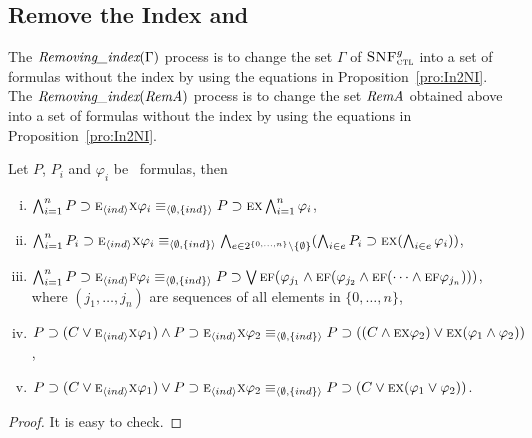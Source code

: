 \documentclass[letterpaper]{article} %
\begin{document}
\subsection{Remove the Index and \start}
The $\emph{Removing\_index}(\Gamma)$ process is to change the set $\Gamma$ of ${\textsc{SNF}_{\textsc{ctl}}^g}$ into a set of formulas without the index by using the equations in Proposition~\ref{pro:In2NI}.
The $\emph{Removing\_index}(\emph{RemA})$ process is to change the set $\emph{RemA}$ obtained above into a set of formulas without the index by using the equations in Proposition~\ref{pro:In2NI}.
\begin{proposition}\label{pro:In2NI}
Let $P$, $P_i$ and $\varphi_i$ be \CTL\ formulas, then
\begin{enumerate}[(i)]
  \item $\bigwedge_{i=1}^n P\supset \textsc{e}_{{\langle{ind}\rangle}} \textsc{x} \varphi_i   \equiv_{{\langle{\emptyset, \{ind\}}\rangle}} P\supset \textsc{e} \textsc{x} \bigwedge_{i=1}^n \varphi_i$,
  \item $\bigwedge_{i=1}^n P_i\supset \textsc{e}_{{\langle{ind}\rangle}} \textsc{x} \varphi_i \equiv_{{\langle{\emptyset, \{ind\}}\rangle}} \bigwedge_{e \in 2^{\{0,\dots, n\}} \setminus \{\emptyset\}}(\bigwedge_{i\in e}P_i\supset \textsc{e} \textsc{x} (\bigwedge_{i\in e}\varphi_i))$,
  \item $\bigwedge_{i=1}^n P\supset \textsc{e}_{{\langle{ind}\rangle}} \textsc{f} \varphi_i  \equiv_{{\langle{\emptyset, \{ind\}}\rangle}} P\supset \bigvee\textsc{e}\textsc{f} (\varphi_{j_1} \wedge \textsc{e}\textsc{f}(\varphi_{j_2} \wedge \textsc{e}\textsc{f}(\dots \wedge \textsc{e}\textsc{f} \varphi_{j_n})))$, where $(j_1, \dots, j_n)$ are sequences of all elements in $\{0, \dots, n\}$,
  \item $P\supset (C \vee \textsc{e}_{{\langle{ind}\rangle}} \textsc{x} \varphi_1) \wedge P \supset \textsc{e}_{{\langle{ind}\rangle}} \textsc{x} \varphi_2 \equiv_{{\langle{\emptyset, \{ind\}}\rangle}} P \supset ((C \wedge \textsc{e} \textsc{x} \varphi_2) \vee \textsc{e} \textsc{x} (\varphi_1 \wedge \varphi_2))$,
  \item $P\supset (C \vee \textsc{e}_{{\langle{ind}\rangle}} \textsc{x} \varphi_1) \vee P \supset \textsc{e}_{{\langle{ind}\rangle}} \textsc{x} \varphi_2 \equiv_{{\langle{\emptyset, \{ind\}}\rangle}} P \supset (C \vee \textsc{e} \textsc{x} (\varphi_1 \vee \varphi_2))$.
\end{enumerate}
\end{proposition}
\begin{proof}
It is easy to check.
\end{proof}
\end{document}
